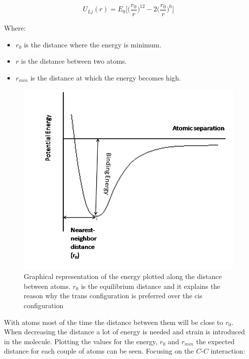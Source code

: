 	$$U_{Lj}(r) = E_0\biggl[\biggl(\frac{r_0}{r}\biggr)^{12}-2\biggl(\frac{r_0}{r}\biggr)^6\biggr]$$

	Where:

	\begin{multicols}{2}
		\begin{itemize}
			\item $r_0$ is the distance where the energy is minimum.
			\item $r$ is the distance between two atoms.
			\item $r_{min}$ is the distance at which the energy becomes high.
		\end{itemize}
	\end{multicols}

	\begin{figure}[H]
			\centering
			\includegraphics[width=\textwidth]{potential.png}
			\caption{Graphical representation of the energy plotted along the distance between atoms. $r_0$ is the equilibrium distance and it explains the reason why the trans configuration is preferred over the cis configuration}
			\label{fig:potential}
			\end{figure}

	With atoms most of the time the distance between them will be close to $r_0$.
	When decreasing the distance a lot of energy is needed and strain is introduced in the molecule.
	Plotting the values for the energy, $r_0$ and $r_{min}$ the expected distance for each couple of atoms can be seen.
	Focusing on the $C$-$C$ interaction:

